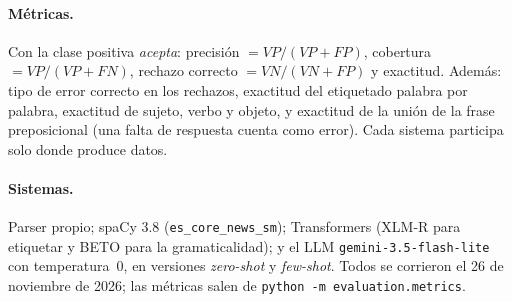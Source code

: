 \paragraph{Métricas.} Con la clase positiva \emph{acepta}:
precisión $= VP/(VP+FP)$, cobertura $= VP/(VP+FN)$, rechazo correcto $= VN/(VN+FP)$ y
exactitud. Además: tipo de error correcto en los rechazos, exactitud del etiquetado palabra por
palabra, exactitud de sujeto, verbo y objeto, y exactitud de la unión de la frase preposicional
(una falta de respuesta cuenta como error). Cada sistema participa solo donde produce datos.

\paragraph{Sistemas.} Parser propio; spaCy 3.8 (\texttt{es\_core\_news\_sm}); Transformers
(XLM-R para etiquetar y BETO para la gramaticalidad); y el LLM \texttt{gemini-3.5-flash-lite}
con temperatura~0, en versiones \emph{zero-shot} y \emph{few-shot}. Todos se corrieron el 26 de
noviembre de 2026; las métricas salen de \texttt{python -m evaluation.metrics}.
